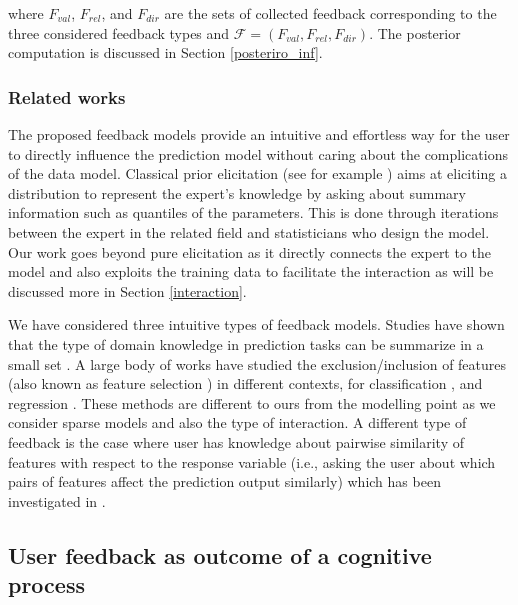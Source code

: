\documentclass[dissertation,math,vertlayout,pdfa,colorlinks]{aaltoseries}
\newcommand{\bF}{\mathcal{F}}
\begin{document}
\noindent where $F_{val}$, $F_{rel}$, and $F_{dir}$ are the sets of collected feedback corresponding to the three considered feedback types and $\bF = (F_{val}, F_{rel}, F_{dir})$. The posterior computation is discussed in Section \ref{posteriro_inf}.




\subsubsection{Related works}

The proposed feedback models provide an intuitive and effortless way for the user to directly influence the prediction model without caring about the complications of the data model. Classical prior elicitation (see for example \cite{OHagan06,garthwaite2005statistical}) aims at eliciting a distribution to represent the expert's knowledge by asking about summary information such as quantiles of the parameters. This is done through iterations between the expert in the related field and statisticians who design the model. Our work goes beyond pure elicitation as it directly connects the expert to the model and also exploits the training data to facilitate the interaction as will be discussed more in Section \ref{interaction}.

We have considered three intuitive types of feedback models. Studies have shown that the type of domain knowledge in prediction tasks can be summarize in a small set \cite{concept_driven_CHI2019}. A large body of works have studied the exclusion/inclusion of features (also known as feature selection \cite{Correia2019HumanintheLoopFS}) in different contexts, for classification  \cite{raghavan2006active,druck2009active,settles2011closing}, and regression \cite{Micallef_elicitation}. These methods are different to ours from the modelling point as we consider sparse models and also the type of interaction. A different type of feedback is the case where user has knowledge about pairwise similarity of features with respect to the response variable (i.e., asking the user about which  pairs of features affect the prediction output similarly) which has been investigated in \cite{Homayun_pairwise_UMAP,Homayun_pairwise_ijcai2019}.  

\subsection{User feedback as outcome of a cognitive process}
\end{document}
